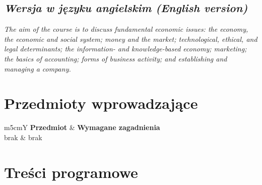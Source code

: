 \documentclass[12pt, a4paper]{article}
\newcommand{\thdrule}{\noalign{\global\setlength{\extrarowheight}{0pt}}}
\newcommand{\thdend}{\noalign{\global\setlength{\extrarowheight}{3pt}}}
\begin{document}
\subsection*{\textit{Wersja w języku angielskim (English version)}}

\textit{The aim of the course is to discuss fundamental economic issues: the economy, the economic and social system; money and the market; technological, ethical, and legal determinants; the information- and knowledge-based economy; marketing; the basics of accounting; forms of business activity; and establishing and managing a company.}


\section{Przedmioty wprowadzające}

{\scriptsize
\begin{tabularx}{\textwidth}{m{5cm}Y}
\thdrule\toprule
{} {\color{white}\textbf{Przedmiot}} & {\color{white}\textbf{Wymagane zagadnienia}} \\
\midrule\thdend
   brak & brak \\
\bottomrule
\end{tabularx}}

\section{Treści programowe}
\end{document}
